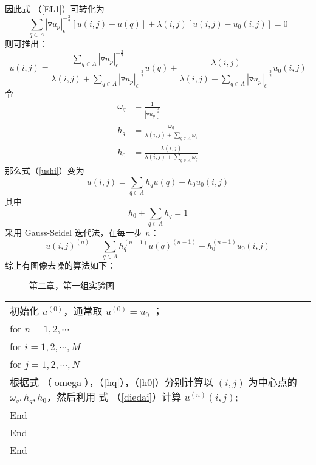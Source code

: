 因此式 （\ref{EL1}）可转化为
\begin{equation}
\sum_{q \in A} |\triangledown u_p|_\epsilon^{-\frac{3}{2}}[u(i,j)-u(q)]+\lambda (i,j)[u(i,j)-u_0(i,j)]=0
\end{equation}
则可推出：
\begin{equation}
\label{ushi}
u(i,j)=\frac{\sum_{q \in A} |\triangledown u_p|_\epsilon^{-\frac{3}{2}}}{\lambda (i,j)+\sum_{q \in A} |\triangledown u_p|_\epsilon^{-\frac{3}{2}}}u(q)+\frac{\lambda (i,j)}{\lambda (i,j)+\sum_{q \in A} |\triangledown u_p|_\epsilon^{-\frac{3}{2}}}u_0(i,j)
\end{equation}
令
\begin{align}
\label{omega}
\omega_q&=\frac{1}{|\triangledown u_p|_\epsilon^{\frac{3}{2}}} \\
\label{hq}
h_q&=\frac{\omega_q}{\lambda (i,j)+\sum_{q \in A} \omega _q} \\
\label{h0}
h_0&=\frac{\lambda (i,j)}{\lambda (i,j)+\sum_{q \in A} \omega _q}
\end{align}
那么式（\ref{ushi}）变为
\begin{equation}
u(i,j)=\sum_{q \in A}h_qu(q)+h_0u_0(i,j)
\end{equation}
其中
\begin{equation}
h_0+\sum_{q \in A}h_q=1
\end{equation}
采用 Gauss-Seidel 迭代法，在每一步 $n$：
\begin{equation}
\label{diedai}
u(i,j)^{(n)}=\sum_{q \in A}h_q^{(n-1)}u(q)^{(n-1)}+h_0^{(n-1)}u_0(i,j)
\end{equation}
综上有图像去噪的算法如下：
\begin{figure}[h]
\centering
\subfigure[$\lambda=\frac{1}{20^2}$]{\label{figure:1/20} \texttt{[image: 003]}}
\subfigure[$\lambda=\frac{5}{20^2}$]{\label{figure:5/20} \texttt{[image: 004]}}
\caption{第二章，第一组实验图}
\end{figure}
\begin{tabular}{|p{10cm}|}
\hline
初始化 $u^{(0)}$，通常取 $u^{(0)}=u_0$ ；\\
for $n=1,2,\cdots$  \\
 \quad for $i=1,2,\cdots,M$  \\
   \qquad for $j=1,2,\cdots,N$   \\
根据式 （\ref{omega}），（\ref{hq}），（\ref{h0}）分别计算以 $(i,j)$ 为中心点的 $\omega_q,h_q,h_0$，然后利用
式 （\ref{diedai}）计算 $u^{(n)}(i,j)$;\\
End \\
\quad End \\
    \qquad End \\
\hline
\end{tabular}